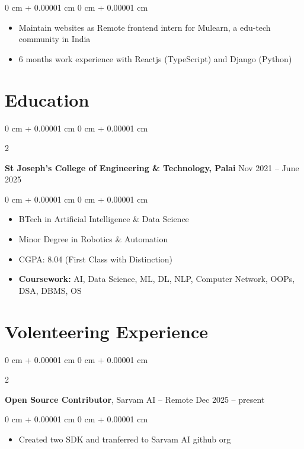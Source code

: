 \documentclass[10pt, letterpaper]{article}
\newenvironment{highlights}{
    \begin{itemize}[
        topsep=0.10 cm,
        parsep=0.10 cm,
        partopsep=0pt,
        itemsep=0pt,
        leftmargin=0 cm + 10pt
    ]
}{
    \end{itemize}
} %
\newenvironment{onecolentry}{
    \begin{adjustwidth}{
        0 cm + 0.00001 cm
    }{
        0 cm + 0.00001 cm
    }
}{
    \end{adjustwidth}
} %
\newenvironment{twocolentry}[2][]{
    \onecolentry
    \def\secondColumn{#2}
    \setcolumnwidth{\fill, 4.5 cm}
    \begin{paracol}{2}
}{
    \switchcolumn \raggedleft \secondColumn
    \end{paracol}
    \endonecolentry
} %
\begin{document}
\vspace{0.10 cm}
\begin{onecolentry}
	\begin{highlights}
		\item Maintain websites as Remote frontend intern for Mulearn, a edu-tech community
		in India
		\item 6 months work experience with Reactjs (TypeScript) and Django (Python)
	\end{highlights}
\end{onecolentry}

\vspace{0.2 cm}

\section{Education}

\begin{twocolentry}{
		Nov 2021 – June 2025
	}
	\textbf{St Joseph's College of Engineering \& Technology, Palai}\end{twocolentry}

\vspace{0.10 cm}
\begin{onecolentry}
	\begin{highlights}
		\item BTech in Artificial Intelligence \& Data Science
		\item Minor Degree in Robotics \& Automation
		\item CGPA: 8.04 (First Class with Distinction)
		\item \textbf{Coursework:} AI, Data Science, ML, DL, NLP, Computer Network, OOPs, DSA, DBMS, OS
	\end{highlights}
\end{onecolentry}

\section{Volenteering Experience}

\begin{twocolentry}{
		Dec 2025 – present
	}
	\textbf{Open Source Contributor}, Sarvam AI -- Remote \end{twocolentry}

\vspace{0.10 cm}
\begin{onecolentry}
	\begin{highlights}
		\item Created two SDK and tranferred to Sarvam AI github org
	\end{highlights}
\end{onecolentry}
\end{document}
